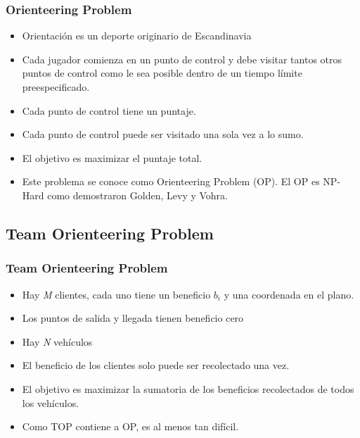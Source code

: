 \documentclass{beamer}
\begin{document}
\begin{frame}
\frametitle{Orienteering Problem}

\begin{itemize}
    \item Orientaci\'on es un deporte originario de Escandinavia
    \pause
    \item Cada jugador comienza en un punto de control y debe visitar tantos otros puntos de control como le sea posible dentro de un tiempo límite preespecificado. 
    \item Cada punto de control tiene un puntaje.
    \item Cada punto de control puede ser visitado una sola vez a lo sumo.
    \pause
    \item El objetivo es maximizar el puntaje total.
    \pause
    \item Este problema se conoce como Orienteering Problem (OP). El OP es NP-Hard como demostraron Golden, Levy y Vohra.
\end{itemize}

\end{frame}


\subsection{Team Orienteering Problem}
\begin{frame}
\frametitle{Team Orienteering Problem}

\begin{itemize}
    \item Hay \textit{M} clientes, cada uno tiene un beneficio $b_i$ y una coordenada en el plano.
    \item Los puntos de salida y llegada tienen beneficio cero
    \item Hay \textit{N} veh\'iculos
    \pause
    \item El beneficio de los clientes solo puede ser recolectado una vez.
    \pause
    \item El objetivo es maximizar la sumatoria de los beneficios recolectados de todos los vehículos.
    \pause
    \item Como TOP contiene a OP, es al menos tan dif\'icil.
\end{itemize}

\end{frame}

\end{document}
